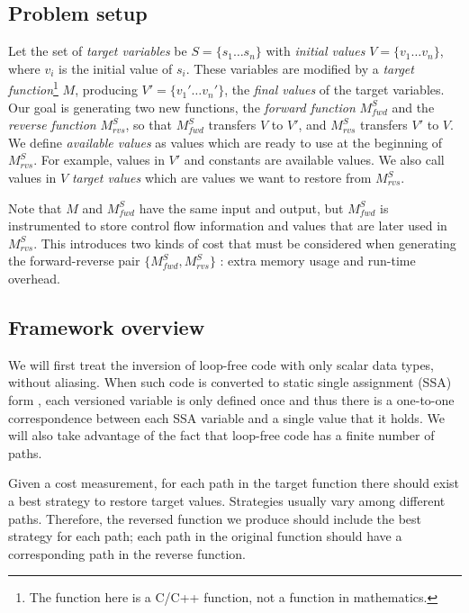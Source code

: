 
\subsection{Problem setup}
Let the set of \emph{target variables} be $S=\{s_1\dots s_n\}$ with \emph{initial values} $V=\{v_1 \dots v_n\}$, where $v_i$ is the initial value of $s_i$. These variables are modified by a \emph{target function}\footnote{The function here is a C/C++ function, not a function in mathematics.} $M$, producing $V' =\{v_1' \dots v_n'\}$, the \emph{final values} of the target variables. Our goal is generating two new functions, the \emph{forward function} $M^S_{fwd}$ and the \emph{reverse function} $M^S_{rvs}$, so that $M^S_{fwd}$ transfers $V$ to $V'$, and $M^S_{rvs}$ transfers $V'$ to $V$. We define \emph{available values} as values which are ready to use at the beginning of $M^S_{rvs}$. For example, values in $V'$ and constants are available values. We also call values in $V$ \emph{target values} which are values we want to restore from $M^S_{rvs}$.


Note that $M$ and $M^S_{fwd}$ have the same input and output, but $M^S_{fwd}$ is instrumented to store control flow information and values that are later used in $M^S_{rvs}$. 
This introduces two kinds of cost that must be considered when generating the forward-reverse pair $\{M^S_{fwd}, M^S_{rvs}\}$ : 
extra memory usage and run-time overhead.  


\subsection{Framework overview}

We will first treat the inversion of loop-free code with only scalar data types, without aliasing.
When such code is converted to static single assignment (SSA) form \cite{Cytron1991}, each versioned variable is only defined once and thus there is a one-to-one correspondence between each SSA variable and a single value that it holds.
We will also take advantage of the fact that loop-free code has a finite number of paths.

Given a cost measurement, for each path in the target function there should exist a best strategy to restore target values. 
Strategies usually vary among different paths. 
Therefore, the reversed function we produce should include the best strategy for each path; each path in the original function should have a corresponding path in the reverse function. 

